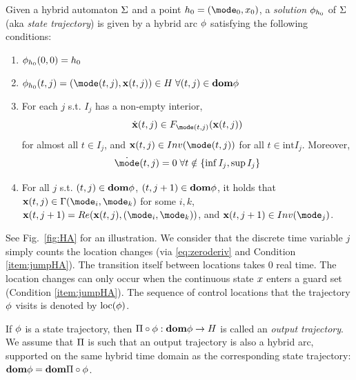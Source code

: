 Given a hybrid automaton $\Sigma$ and a point $\hsPt_0  = (\mode_0, \stPt_0)$, 
a \emph{solution} $\mathbf{\phi}_{h_0}$ of $\Sigma$ (aka \emph{state trajectory}) is given by a hybrid arc $\mathbf{\phi}$ 
satisfying the following conditions:
\begin{enumerate}
	\item $\mathbf{\phi}_{h_0}(0,0) = h_0$
	\item $\hstraj_{h_0}(t,j) = (\mode(t,j),\sttraj(t,j)) \in \hsSet \; \forall (t,j) \in \dom \hstraj$
	\label{item:explicitLX}
	\item For each $j$ s.t. $I_j$ has a non-empty interior, 
	\[\dot{\sttraj}(t,j) \in F_{\mode(t,j)}(\sttraj(t,j))\]
	for almost all $t \in I_j$, and $\sttraj(t,j) \in Inv(\mode(t,j))$ for all $t \in \text{int}I_j$.
	Moreover, 
	\begin{equation*}
	\label{eq:zeroderiv}
	\dot{\mode}(t,j) = 0 \; \forall t \notin \{ \inf I_j, \sup I_j\}
	\end{equation*}
	\label{item:contevolutions}
	\item For all $j$ s.t. $(t,j) \in \mathbf{dom} \mathbf{\phi}$, $(t,j+1) \in \mathbf{dom} \mathbf{\phi}$, it holds that $\sttraj(t,j) \in \guard(\mode_i,\mode_k)$ for some $i,k$,
	$\sttraj(t, j+1) = \reset(\sttraj(t,j), (\mode_i,\mode_k))$,
	and $\sttraj(t,j+1) \in Inv(\mode_j)$.
	\label{item:jumpHA}
\end{enumerate}
See Fig.~\ref{fig:HA} for an illustration.
We consider that the discrete time variable $j$ simply counts the location changes (via \eqref{eq:zeroderiv} and Condition \ref{item:jumpHA}).
The transition itself between locations takes 0 real time.
The location changes can only occur when the continuous state $x$ enters a guard set (Condition \ref{item:jumpHA}). 
The sequence of control locations that the trajectory $\mathbf{\phi}$ visits is denoted by $\mbox{loc}(\mathbf{\phi})$.

If $\mathbf{\phi}$ is a state trajectory, then $\Pi \circ \mathbf{\phi}: \mathbf{dom} \mathbf{\phi} \rightarrow H$ is called an \emph{output trajectory}.
We assume that $\Pi$ is such that an output trajectory is also a hybrid arc, supported on the same hybrid time domain as the corresponding state trajectory:
$\mathbf{dom} \mathbf{\phi} = \mathbf{dom} \Pi \circ \mathbf{\phi}$.

